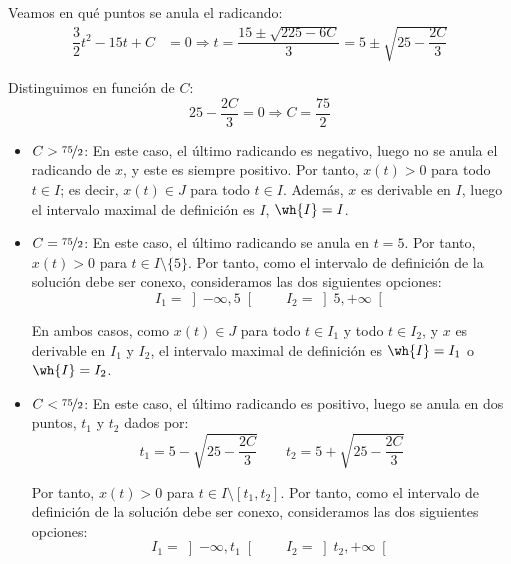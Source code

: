 \begin{ejercicio}
\begin{itemize}
        Veamos en qué puntos se anula el radicando:
        \begin{align*}
            \dfrac{3}{2}t^2 - 15t + C &= 0 \Longrightarrow t = \dfrac{15\pm\sqrt{225-6C}}{3} = 5\pm\sqrt{25-\dfrac{2C}{3}}
        \end{align*}

        Distinguimos en función de $C$:
        \begin{equation*}
            25 - \dfrac{2C}{3} = 0 \Longrightarrow C = \dfrac{75}{2}
        \end{equation*}
        \begin{itemize}
            \item \ul{$C>\nicefrac{75}{2}$}: En este caso, el último radicando es negativo, luego no se anula el radicando de $x$, y este es siempre positivo. Por tanto, $x(t)>0$ para todo $t\in I$; es decir, $x(t)\in J$ para todo $t\in I$. Además, $x$ es derivable en $I$, luego el intervalo maximal de definición es $I$, $\wh{I}=I$.
            
            \item \ul{$C=\nicefrac{75}{2}$}: En este caso, el último radicando se anula en $t=5$. Por tanto, $x(t)>0$ para $t\in I\setminus \{5\}$. Por tanto, como el intervalo de definición de la solución debe ser conexo, consideramos las dos siguientes opciones:
            \begin{equation*}
                I_1 = \left]-\infty, 5\right[ \qquad I_2 = \left]5, +\infty\right[
            \end{equation*}

            En ambos casos, como $x(t)\in J$ para todo $t\in I_1$ y todo $t\in I_2$, y $x$ es derivable en $I_1$ y $I_2$, el intervalo maximal de definición es $\wh{I}=I_1$ o $\wh{I}=I_2$.

            \item \ul{$C<\nicefrac{75}{2}$}: En este caso, el último radicando es positivo, luego se anula en dos puntos, $t_1$ y $t_2$ dados por:
            \begin{equation*}
                t_1 = 5-\sqrt{25-\dfrac{2C}{3}} \qquad t_2 = 5+\sqrt{25-\dfrac{2C}{3}}
            \end{equation*}

            Por tanto, $x(t)>0$ para $t\in I\setminus [t_1,t_2]$. Por tanto, como el intervalo de definición de la solución debe ser conexo, consideramos las dos siguientes opciones:
            \begin{equation*}
                I_1 = \left]-\infty, t_1\right[ \qquad I_2 = \left]t_2, +\infty\right[
            \end{equation*}


\end{itemize}
\end{itemize}
\end{ejercicio}
